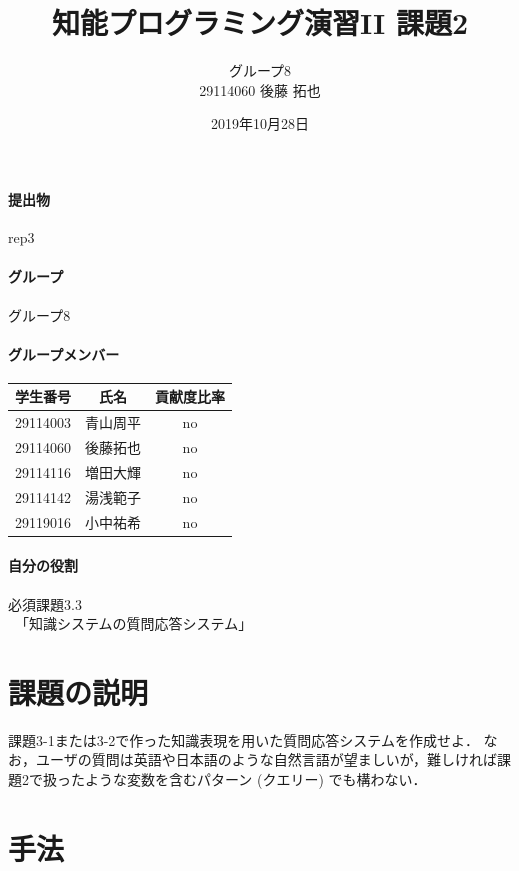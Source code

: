 \documentclass[uplatex,12pt]{jsarticle}
\title{知能プログラミング演習II 課題2}
\author{グループ8\\
  29114060 後藤 拓也\\
}
\date{2019年10月28日}
\begin{document}
\maketitle

\paragraph{提出物} rep3

\paragraph{グループ} グループ8

\paragraph{グループメンバー}
\begin{center}
\begin{tabular}{|c|c|c|}
  \hline
  学生番号&氏名&貢献度比率\\
  \hline\hline
  29114003&青山周平&no\\
  \hline
  29114060&後藤拓也&no\\
  \hline
  29114116&増田大輝&no\\
  \hline
  29114142&湯浅範子&no\\
  \hline
  29119016&小中祐希&no\\
  \hline
\end{tabular}
\end{center}
\paragraph{自分の役割} 必須課題3.3
\\　「知識システムの質問応答システム」
\section{課題の説明}
\begin{screen}
課題3-1または3-2で作った知識表現を用いた質問応答システムを作成せよ．
なお，ユーザの質問は英語や日本語のような自然言語が望ましいが，難しければ課題2で扱ったような変数を含むパターン (クエリー) でも構わない．
\end{screen}

\section{手法}
\end{document}
